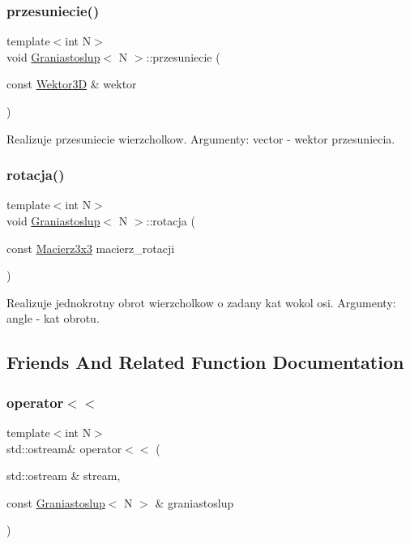 \subsubsection{\texorpdfstring{przesuniecie()}{przesuniecie()}}
{\footnotesize\ttfamily template$<$int N$>$ \\
void \mbox{\hyperlink{class_graniastoslup}{Graniastoslup}}$<$ N $>$\+::przesuniecie (\begin{DoxyParamCaption}\item[{const \mbox{\hyperlink{class_wektor}{Wektor3D}} \&}]{wektor }\end{DoxyParamCaption})\hspace{0.3cm}{\ttfamily [inline]}}

Realizuje przesuniecie wierzcholkow. Argumenty\+: vector -\/ wektor przesuniecia. \mbox{\label{class_graniastoslup_a701f6fe18e914843ed32e7ea9dd9e433}} 
\subsubsection{\texorpdfstring{rotacja()}{rotacja()}}
{\footnotesize\ttfamily template$<$int N$>$ \\
void \mbox{\hyperlink{class_graniastoslup}{Graniastoslup}}$<$ N $>$\+::rotacja (\begin{DoxyParamCaption}\item[{const \mbox{\hyperlink{class_macierz}{Macierz3x3}}}]{macierz\+\_\+rotacji }\end{DoxyParamCaption})\hspace{0.3cm}{\ttfamily [inline]}}

Realizuje jednokrotny obrot wierzcholkow o zadany kat wokol osi. Argumenty\+: angle -\/ kat obrotu. 

\subsection{Friends And Related Function Documentation}
\mbox{\label{class_graniastoslup_a16f3e79ecd1cf7191844403324ddc5cb}} 
\subsubsection{\texorpdfstring{operator$<$$<$}{operator<<}}
{\footnotesize\ttfamily template$<$int N$>$ \\
std\+::ostream\& operator$<$$<$ (\begin{DoxyParamCaption}\item[{std\+::ostream \&}]{stream,  }\item[{const \mbox{\hyperlink{class_graniastoslup}{Graniastoslup}}$<$ N $>$ \&}]{graniastoslup }\end{DoxyParamCaption})\hspace{0.3cm}{\ttfamily [friend]}}

